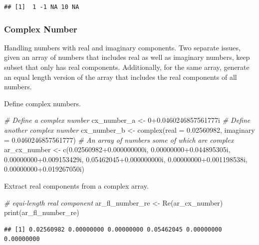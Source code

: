 \documentclass[
]{book}
\newenvironment{Shaded}{\begin{snugshade}}{\end{snugshade}}
\newcommand{\AttributeTok}[1]{\textcolor[rgb]{0.77,0.63,0.00}{#1}}
\newcommand{\CommentTok}[1]{\textcolor[rgb]{0.56,0.35,0.01}{\textit{#1}}}
\newcommand{\DecValTok}[1]{\textcolor[rgb]{0.00,0.00,0.81}{#1}}
\newcommand{\FloatTok}[1]{\textcolor[rgb]{0.00,0.00,0.81}{#1}}
\newcommand{\FunctionTok}[1]{\textcolor[rgb]{0.00,0.00,0.00}{#1}}
\newcommand{\NormalTok}[1]{#1}
\newcommand{\OtherTok}[1]{\textcolor[rgb]{0.56,0.35,0.01}{#1}}
\begin{document}
\begin{verbatim}
## [1]  1 -1 NA 10 NA
\end{verbatim}

\hypertarget{complex-number}{%
\subsubsection{Complex Number}\label{complex-number}}

Handling numbers with real and imaginary components. Two separate issues, given an array of numbers that includes real as well as imaginary numbers, keep subset that only has real components. Additionally, for the same array, generate an equal length version of the array that includes the real components of all numbers.

Define complex numbers.

\begin{Shaded}
\begin{Highlighting}[]
\CommentTok{\# Define a complex number}
\NormalTok{cx\_number\_a }\OtherTok{\textless{}{-}} \DecValTok{0}\FloatTok{+0.0460246857561777}\NormalTok{i}
\CommentTok{\# Define another complex number}
\NormalTok{cx\_number\_b }\OtherTok{\textless{}{-}} \FunctionTok{complex}\NormalTok{(}\AttributeTok{real =} \FloatTok{0.02560982}\NormalTok{, }\AttributeTok{imaginary =} \FloatTok{0.0460246857561777}\NormalTok{)}
\CommentTok{\# An array of numbers some of which are complex}
\NormalTok{ar\_cx\_number }\OtherTok{\textless{}{-}} \FunctionTok{c}\NormalTok{(}\FloatTok{0.02560982+0.000000000}\NormalTok{i, }\FloatTok{0.00000000+0.044895305}\NormalTok{i, }
                  \FloatTok{0.00000000+0.009153429}\NormalTok{i, }\FloatTok{0.05462045+0.000000000}\NormalTok{i, }
                  \FloatTok{0.00000000+0.001198538}\NormalTok{i, }\FloatTok{0.00000000+0.019267050}\NormalTok{i)}
\end{Highlighting}
\end{Shaded}

Extract real components from a complex array.

\begin{Shaded}
\begin{Highlighting}[]
\CommentTok{\# equi{-}length real component}
\NormalTok{ar\_fl\_number\_re }\OtherTok{\textless{}{-}} \FunctionTok{Re}\NormalTok{(ar\_cx\_number)}
\FunctionTok{print}\NormalTok{(ar\_fl\_number\_re)}
\end{Highlighting}
\end{Shaded}

\begin{verbatim}
## [1] 0.02560982 0.00000000 0.00000000 0.05462045 0.00000000 0.00000000
\end{verbatim}
\end{document}
